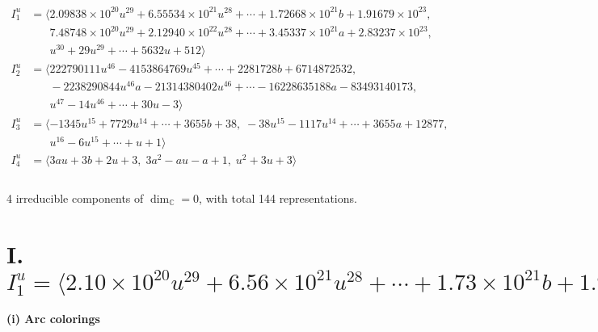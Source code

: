 \documentclass[1p]{elsarticle_modified}
\theoremstyle{definition}
\begin{document}
\begin{align*}
I^u_{1}&=\langle 
2.09838\times10^{20} u^{29}+6.55534\times10^{21} u^{28}+\cdots+1.72668\times10^{21} b+1.91679\times10^{23},\\
\phantom{I^u_{1}}&\phantom{= \langle  }7.48748\times10^{20} u^{29}+2.12940\times10^{22} u^{28}+\cdots+3.45337\times10^{21} a+2.83237\times10^{23},\\
\phantom{I^u_{1}}&\phantom{= \langle  }u^{30}+29 u^{29}+\cdots+5632 u+512\rangle \\
I^u_{2}&=\langle 
222790111 u^{46}-4153864769 u^{45}+\cdots+2281728 b+6714872532,\\
\phantom{I^u_{2}}&\phantom{= \langle  }-2238290844 u^{46} a-21314380402 u^{46}+\cdots-16228635188 a-83493140173,\\
\phantom{I^u_{2}}&\phantom{= \langle  }u^{47}-14 u^{46}+\cdots+30 u-3\rangle \\
I^u_{3}&=\langle 
-1345 u^{15}+7729 u^{14}+\cdots+3655 b+38,\;-38 u^{15}-1117 u^{14}+\cdots+3655 a+12877,\\
\phantom{I^u_{3}}&\phantom{= \langle  }u^{16}-6 u^{15}+\cdots+u+1\rangle \\
I^u_{4}&=\langle 
3 a u+3 b+2 u+3,\;3 a^2- a u- a+1,\;u^2+3 u+3\rangle \\
\\
\end{align*}
\raggedright * 4 irreducible components of $\dim_{\mathbb{C}}=0$, with total 144 representations.\\
\newpage
\renewcommand{\arraystretch}{1}
\centering \section*{I. $I^u_{1}= \langle 2.10\times10^{20} u^{29}+6.56\times10^{21} u^{28}+\cdots+1.73\times10^{21} b+1.92\times10^{23},\;7.49\times10^{20} u^{29}+2.13\times10^{22} u^{28}+\cdots+3.45\times10^{21} a+2.83\times10^{23},\;u^{30}+29 u^{29}+\cdots+5632 u+512 \rangle$}
\flushleft \textbf{(i) Arc colorings}\\
\end{document}
